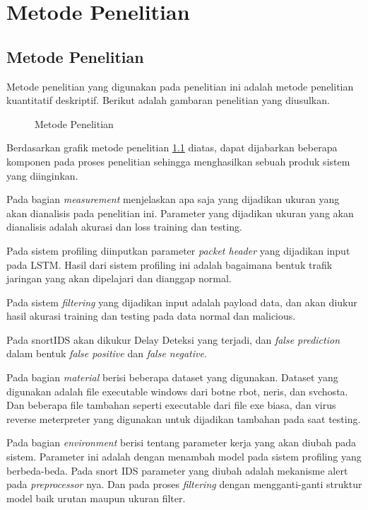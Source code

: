\documentclass[./skripsi.tex]{subfiles}
\begin{document}
\chapter{Metode Penelitian}
\section{Metode Penelitian}
\par Metode penelitian yang digunakan pada penelitian ini adalah metode penelitian kuantitatif deskriptif. Berikut adalah gambaran penelitian yang diusulkan.
\begin{figure}[H]
    \centering
    \caption{Metode Penelitian}
    \label{fig:fishbonepenelitian}
\end{figure}
\par Berdasarkan grafik metode penelitian \ref{fig:fishbonepenelitian} diatas, dapat dijabarkan beberapa komponen pada proses penelitian sehingga menghasilkan sebuah produk sistem yang diinginkan.
\par Pada bagian \textit{measurement} menjelaskan apa saja yang dijadikan ukuran yang akan dianalisis pada penelitian ini. Parameter yang dijadikan ukuran yang akan dianalisis adalah akurasi dan loss training dan testing.
\par Pada sistem profiling diinputkan parameter \textit{packet header} yang dijadikan input pada LSTM. Hasil dari sistem profiling ini adalah bagaimana bentuk trafik jaringan yang akan dipelajari dan dianggap normal.
\par Pada sistem \textit{filtering} yang dijadikan input adalah payload data, dan akan diukur hasil akurasi training dan testing pada data normal dan malicious.
\par Pada snortIDS akan dikukur Delay Deteksi yang terjadi, dan \textit{false prediction} dalam bentuk \textit{false positive} dan \textit{false negative}.
\par Pada bagian \textit{material} berisi beberapa dataset yang digunakan. Dataset yang digunakan adalah file executable windows dari botne rbot, neris, dan svchosta. Dan beberapa file tambahan seperti executable dari file exe biasa, dan virus reverse meterpreter yang digunakan untuk dijadikan tambahan pada saat testing.
\par Pada bagian \textit{environment} berisi tentang parameter kerja yang akan diubah pada sistem. Parameter ini adalah dengan menambah model pada sistem profiling yang berbeda-beda. Pada snort IDS parameter yang diubah adalah mekanisme alert pada \textit{preprocessor} nya. Dan pada proses \textit{filtering} dengan mengganti-ganti struktur model baik urutan maupun ukuran filter.
\end{document}
